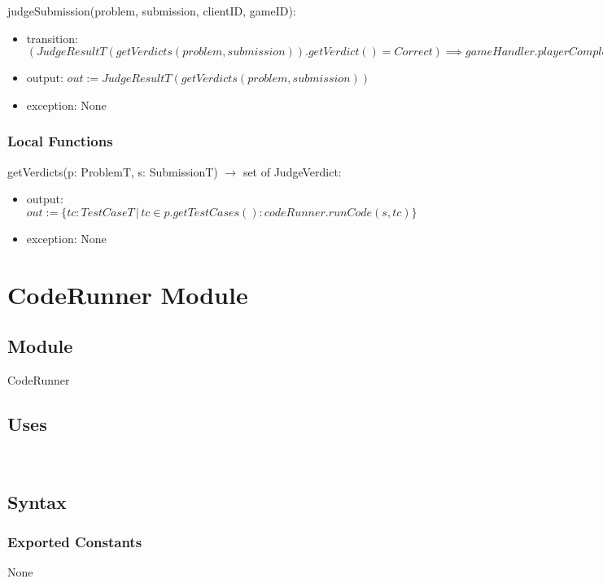 \documentclass[12pt, titlepage]{article}
\begin{document}
\noindent judgeSubmission(problem, submission, clientID, gameID):
\begin{itemize}
\item transition: $(JudgeResultT(getVerdicts(problem, submission)).getVerdict() = Correct) \implies gameHandler.playerCompleteRound(clientID, gameID)$
\item output:  $out := JudgeResultT(getVerdicts(problem, submission))$
\item exception: None
\end{itemize}

\subsubsection{Local Functions}
\noindent getVerdicts(p: ProblemT, s: SubmissionT) $\rightarrow$ set of JudgeVerdict:
\begin{itemize}
\item output: $out := \{ tc: TestCaseT \, | \, tc \in p.getTestCases() : codeRunner.runCode(s, tc )\}$
\item exception: None
\end{itemize}

\newpage

\section{CodeRunner Module} \label{CodeRunner} 

\subsection{Module}

CodeRunner

\subsection{Uses}

\\

\subsection{Syntax}

\subsubsection{Exported Constants}

None
\end{document}
